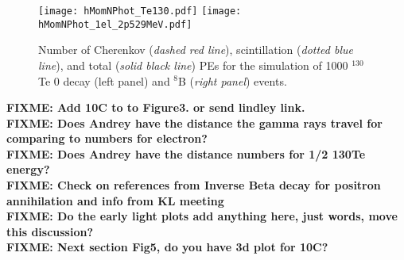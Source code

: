 \begin{figure*}[ht]
  \centering
  \texttt{[image: hMomNPhot\_Te130.pdf]}
  \texttt{[image: hMomNPhot\_1el\_2p529MeV.pdf]}
  \caption{Number of Cherenkov (\emph{dashed red line}), scintillation
    (\emph{dotted blue line}), and total (\emph{solid black line}) PEs
    for the simulation of 1000 $^{130}$Te 0{\nbb} decay (left panel)
    and $^8$B (\emph{right panel}) events.}
\label{fig:NPhotDist}
\end{figure*}

\textbf{FIXME: Add 10C to to Figure3. or send lindley link.} \\
\textbf{FIXME: Does Andrey have the distance the gamma rays travel for comparing to numbers for electron?} \\
\textbf{FIXME: Does Andrey have the distance numbers for 1/2 130Te energy?} \\
\textbf{FIXME: Check on references from Inverse Beta decay for positron annihilation and info from KL meeting}\\
\textbf{FIXME: Do the early light plots add anything here, just words, move this discussion?}\\
\textbf{FIXME: Next section Fig5, do you have 3d plot for 10C?}
